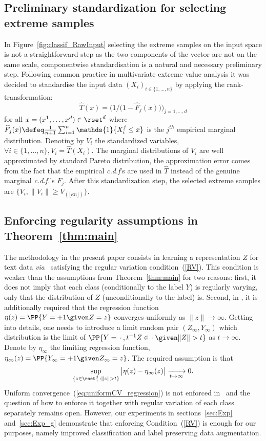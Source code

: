 \subsection{Preliminary standardization for selecting extreme samples} In Figure~\ref{fig:classif_RawInput} selecting the extreme samples on the input space is not a straightforward step as the two components of the vector are not on the same scale, componentwise standardisation is a natural and necessary preliminary step. Following common practice in multivariate extreme value analysis it was decided to standardise the input data $(X_i)_{i \in \{1,\ldots, n\} }$ by applying the rank-transformation: $$\widehat{T}(x) =\bigg(1 / \Big(1 - \widehat{F}_j(x) \Big) \bigg)_{j=1, \ldots, d} $$ for all $x = (x^{1}, \ldots, x^{d}) \in \rset^d$ where $\widehat{F}_j (x) \defeq \frac{1}{n+1}\sum_{i=1}^n \mathds{1}\{X_i^j \leq x\}$ is the $j^{th}$ empirical marginal distribution.
Denoting by $V_i$ the standardized variables, $\forall i \in \{1, \ldots, n \}, V_i = \hat{T}(X_i)$.  The marginal distributions of $V_i$ are well approximated by  standard Pareto distribution, the approximation error comes from the fact that the empirical \emph{c.d.f}'s are used in $\widehat T$ instead of the genuine marginal \emph{c.d.f.}'s $F_j$. After this standardization step, the selected extreme samples are  $\{ V_i, \|V_i\| \geq  V_{(\lfloor \kappa n \rfloor)} \}$. 
\subsection{Enforcing regularity assumptions in Theorem~\ref{thm:main}}\label{sec:unifCV_app}
The methodology in the  present paper consists in learning a representation $Z$ for text data \emph{via} \HTalgo\ satisfying the regular variation  condition~(\ref{RV}). This condition   is weaker than the assumptions from Theorem~\ref{thm:main} for two reasons: first, it does not imply that  each class (conditionally to the label $Y$) is regularly varying, only that the distribution of $Z$  (unconditionally to the label) is. Second, 
in \citet{jalalzai2018binary}, it is additionally required that the regression function $\eta(z) =\PP{Y = +1 \given Z=z}$ converges uniformly as $\|z\|\to \infty$. Getting into details, one needs to introduce a limit random pair $(Z_\infty, Y_\infty)$ which distribution is the limit of $\PP{Y = \,\cdot\, ,  t^{-1} Z \in \, \cdot\, \given \|Z\| > t}$ as $t\to \infty$. Denote by $\eta_\infty$ the limiting regression function, $\eta_\infty(z)=  \PP{Y_\infty = +1 \given Z_\infty = z}$. The required assumption is that 
\begin{equation}
    \label{eq:uniformCV_regression}
\sup_{\{z \in \rset_+^d: \|z\| >t\}} \big| \eta(z) - \eta_\infty(z)\big| \xrightarrow[t\to\infty]{} 0. 
\end{equation}
Uniform convergence~(\ref{eq:uniformCV_regression}) is not enforced in \HTalgo\, and the question of how to enforce it together with regular variation of each class separately remains open.  However, our experiments in sections~\ref{sec:Exp} and~\ref{sec:Exp_g} demonstrate  that enforcing  Condition~(\ref{RV})  is enough for our purposes,  namely improved classification and label preserving data augmentation.  
 
